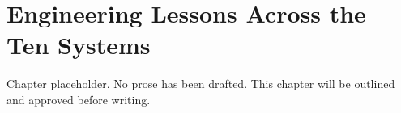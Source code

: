 \chapter{Engineering Lessons Across the Ten Systems}
\begin{notebox}
Chapter placeholder. No prose has been drafted. This chapter will be outlined and approved before writing.
\end{notebox}
